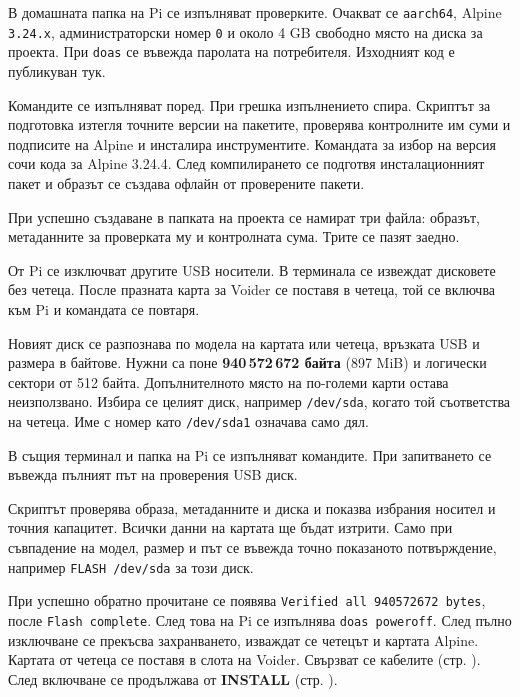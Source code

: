 В домашната папка на Pi се изпълняват проверките. Очакват се \texttt{aarch64}, Alpine \texttt{3.24.x}, администраторски номер \texttt{0} и около 4 GB свободно място на диска за проекта. При \texttt{doas} се въвежда паролата на потребителя.
\envCommands
Изходният код е публикуван тук.\par
\sourceURL\par
Командите се изпълняват поред. При грешка изпълнението спира. Скриптът за подготовка изтегля точните версии на пакетите, проверява контролните им суми и подписите на Alpine и инсталира инструментите. Командата за избор на версия сочи кода за Alpine 3.24.4. След компилирането се подготвя инсталационният пакет и образът се създава офлайн от проверените пакети.
\buildCommands

При успешно създаване в папката на проекта се намират три файла: образът, метаданните за проверката му и контролната сума. Трите се пазят заедно.
\outputFiles

От Pi се изключват другите USB носители. В терминала се извеждат дисковете без четеца. После празната карта за Voider се поставя в четеца, той се включва към Pi и командата се повтаря.
\listCards

Новият диск се разпознава по модела на картата или четеца, връзката USB и размера в байтове. Нужни са поне \textbf{940\,572\,672 байта} (897 MiB) и логически сектори от 512 байта. Допълнителното място на по-големи карти остава неизползвано. Избира се целият диск, например \texttt{/dev/sda}, когато той съответства на четеца. Име с номер като \texttt{/dev/sda1} означава само дял.


В същия терминал и папка на Pi се изпълняват командите. При запитването се въвежда пълният път на проверения USB диск.
\flashCommands

Скриптът проверява образа, метаданните и диска и показва избрания носител и точния капацитет. Всички данни на картата ще бъдат изтрити. Само при съвпадение на модел, размер и път се въвежда точно показаното потвърждение, например \texttt{FLASH /dev/sda} за този диск.

При успешно обратно прочитане се появява \texttt{Verified all 940572672 bytes}, после \texttt{Flash complete}. След това на Pi се изпълнява \texttt{doas poweroff}. След пълно изключване се прекъсва захранването, изваждат се четецът и картата Alpine. Картата от четеца се поставя в слота на Voider. Свързват се кабелите (стр. \pageref{bg:wire}). След включване се продължава от \textbf{INSTALL} (стр. \pageref{bg:install}).

